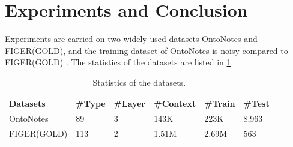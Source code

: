 \documentclass[letterpaper]{article} %
\begin{document}
\section{Experiments and Conclusion}
Experiments are carried on two widely used datasets OntoNotes and FIGER(GOLD), and the training dataset of OntoNotes is noisy compared to FIGER(GOLD) \cite{Shimaoka2016Neural}. The statistics of the datasets are listed in \tablename \ref{dataset}. %
\vspace{-25pt}
\begin{table}[h!]
\small
\centering
\caption{Statistics of the datasets.}
\begin{tabular}{p{1.9cm}|p{0.75cm}p{0.75cm}p{0.83cm}p{0.78cm}p{0.78cm}}
\hline
Datasets & \#Type &\#Layer & \#Context & \#Train & \#Test  \\
\hline
OntoNotes & 89 & 3& 143K & 223K & 8,963  \\
FIGER(GOLD) &  113 & 2& 1.51M & 2.69M & 563  \\
\hline
\end{tabular}
\label{dataset}
\vspace{-14pt}
\end{table}
\end{document}
